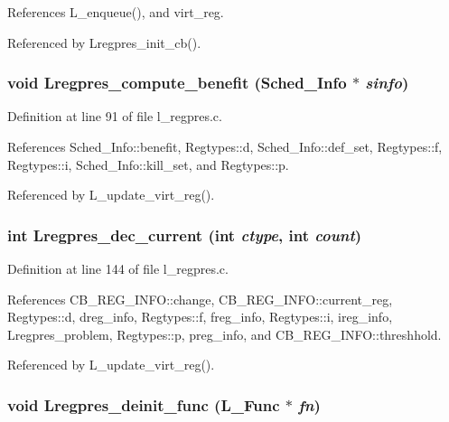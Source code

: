 References L\_\-enqueue(), and virt\_\-reg.

Referenced by Lregpres\_\-init\_\-cb().
\subsubsection{\setlength{\rightskip}{0pt plus 5cm}void Lregpres\_\-compute\_\-benefit (\bf{Sched\_\-Info} $\ast$ {\em sinfo})}\label{l__regpres_8c_7525959893a5935d83a5c7a95119856a}




Definition at line 91 of file l\_\-regpres.c.

References Sched\_\-Info::benefit, Regtypes::d, Sched\_\-Info::def\_\-set, Regtypes::f, Regtypes::i, Sched\_\-Info::kill\_\-set, and Regtypes::p.

Referenced by L\_\-update\_\-virt\_\-reg().
\subsubsection{\setlength{\rightskip}{0pt plus 5cm}int Lregpres\_\-dec\_\-current (int {\em ctype}, int {\em count})}\label{l__regpres_8c_df259cc603a97e20b027bbe5f2732242}




Definition at line 144 of file l\_\-regpres.c.

References CB\_\-REG\_\-INFO::change, CB\_\-REG\_\-INFO::current\_\-reg, Regtypes::d, dreg\_\-info, Regtypes::f, freg\_\-info, Regtypes::i, ireg\_\-info, Lregpres\_\-problem, Regtypes::p, preg\_\-info, and CB\_\-REG\_\-INFO::threshhold.

Referenced by L\_\-update\_\-virt\_\-reg().
\subsubsection{\setlength{\rightskip}{0pt plus 5cm}void Lregpres\_\-deinit\_\-func (L\_\-Func $\ast$ {\em fn})}\label{l__regpres_8c_180d90dbb20fb9775c8ce3b2301372a3}




